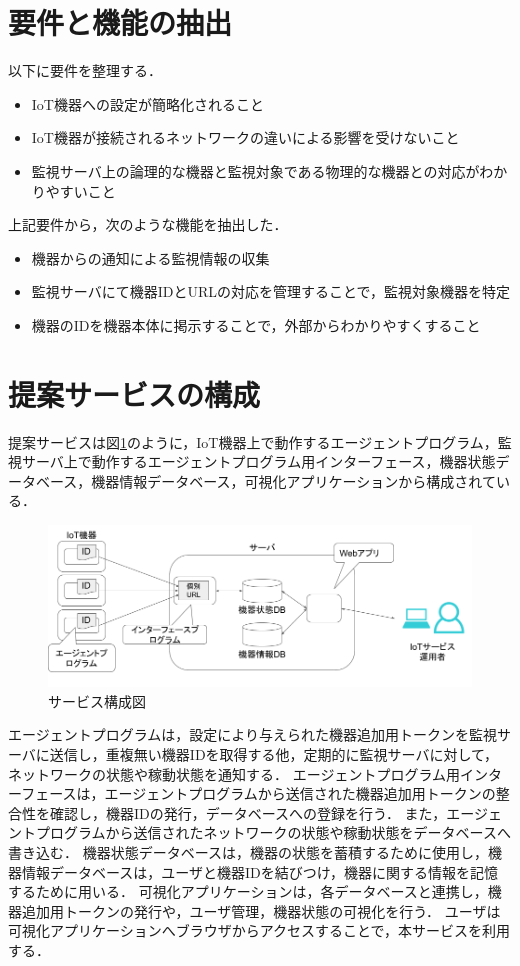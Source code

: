 \section{要件と機能の抽出}
以下に要件を整理する．
\begin{itemize}
\item IoT機器への設定が簡略化されること
\item IoT機器が接続されるネットワークの違いによる影響を受けないこと
\item 監視サーバ上の論理的な機器と監視対象である物理的な機器との対応がわかりやすいこと
\end{itemize}

上記要件から，次のような機能を抽出した．
\begin{itemize}
\item 機器からの通知による監視情報の収集
\item 監視サーバにて機器IDとURLの対応を管理することで，監視対象機器を特定
\item 機器のIDを機器本体に掲示することで，外部からわかりやすくすること
\end{itemize}


\section{提案サービスの構成}
提案サービスは図\ref{fig:blockdiagram}のように，IoT機器上で動作するエージェントプログラム，監視サーバ上で動作するエージェントプログラム用インターフェース，機器状態データベース，機器情報データベース，可視化アプリケーションから構成されている．
\begin{figure}[htbp]
\includegraphics[width=16cm]{images/prop_diag.png}
\caption{サービス構成図}
\label{fig:blockdiagram}
\end{figure}
エージェントプログラムは，設定により与えられた機器追加用トークンを監視サーバに送信し，重複無い機器IDを取得する他，定期的に監視サーバに対して，ネットワークの状態や稼動状態を通知する．
エージェントプログラム用インターフェースは，エージェントプログラムから送信された機器追加用トークンの整合性を確認し，機器IDの発行，データベースへの登録を行う．
また，エージェントプログラムから送信されたネットワークの状態や稼動状態をデータベースへ書き込む．
機器状態データベースは，機器の状態を蓄積するために使用し，機器情報データベースは，ユーザと機器IDを結びつけ，機器に関する情報を記憶するために用いる．
可視化アプリケーションは，各データベースと連携し，機器追加用トークンの発行や，ユーザ管理，機器状態の可視化を行う．
ユーザは可視化アプリケーションへブラウザからアクセスすることで，本サービスを利用する．

